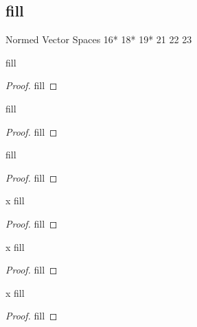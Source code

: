 \subsection{fill}

Normed Vector Spaces 
16*
18*
19*
21
22
23


\begin{exercise}{16}
fill
\end{exercise}
\begin{proof}
fill
\end{proof} 

\begin{exercise}{18}
fill
\end{exercise}
\begin{proof}
fill
\end{proof} 

\begin{exercise}{19}
fill
\end{exercise}
\begin{proof}
fill
\end{proof} 

\begin{exercise}{x}
fill
\end{exercise}
\begin{proof}
fill
\end{proof} 

\begin{exercise}{x}
fill
\end{exercise}
\begin{proof}
fill
\end{proof} 

\begin{exercise}{x}
fill
\end{exercise}
\begin{proof}
fill
\end{proof} 
